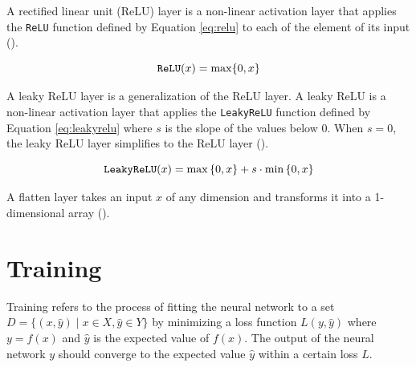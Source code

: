 A rectified linear unit (ReLU) layer is a non-linear activation layer that applies the \verb|ReLU| function defined by Equation \ref{eq:relu} to each of the element of its input (\cite{activation}). 

\begin{equation}
    \verb|ReLU|(x) =  \max\{0, x\}
    \label{eq:relu}
\end{equation}

A leaky ReLU layer is a generalization of the ReLU layer. A leaky ReLU is a non-linear activation layer that applies the \verb|LeakyReLU| function defined by Equation \ref{eq:leakyrelu} where $s$ is the slope of the values below $0$. When $s=0$, the leaky ReLU layer simplifies to the ReLU layer (\cite{activation}).

\begin{equation}
    \verb|LeakyReLU|(x) = \max{\{0, x\}} + s \cdot \min{\{0, x\}}
    \label{eq:leakyrelu}
\end{equation}

A flatten layer takes an input $x$ of any dimension and transforms it into a 1-dimensional array (\cite{wilamowski2009neural}).




\section{Training}

Training refers to the process of fitting the neural network to a set $D = \{ (x,\hat{y}) \mid x \in X, \hat{y} \in Y\}$ by minimizing a loss function $L(y, \hat{y})$ where $y = f(x)$ and $\hat{y}$ is the expected value of $f(x)$. The output of the neural network $y$ should converge to the expected value $\hat{y}$ within a certain loss $L$. 

